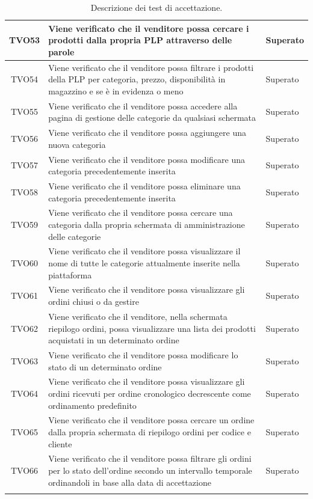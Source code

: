 \begin{longtable}{|c| C{10cm} |C{3cm}|}
	TVO53 & Viene verificato che il venditore possa cercare i prodotti dalla propria PLP attraverso delle parole & Superato\\ \hline
	TVO54 & Viene verificato che il venditore possa filtrare i prodotti della PLP per categoria, prezzo, disponibilità in magazzino e se è in evidenza o meno & Superato\\ \hline
	TVO55 & Viene verificato che il venditore possa accedere alla pagina di gestione delle categorie da qualsiasi schermata & Superato\\ \hline
	TVO56 & Viene verificato che il venditore possa aggiungere una nuova categoria & Superato\\ \hline
	TVO57 & Viene verificato che il venditore possa modificare una categoria precedentemente inserita & Superato\\ \hline
	TVO58 & Viene verificato che il venditore possa eliminare una categoria precedentemente inserita & Superato\\ \hline
	TVO59 & Viene verificato che il venditore possa cercare una categoria dalla propria schermata di amministrazione delle categorie & Superato\\ \hline
	TVO60 & Viene verificato che il venditore possa visualizzare il nome di tutte le categorie attualmente inserite nella piattaforma & Superato\\ \hline
	TVO61 & Viene verificato che il venditore possa visualizzare gli ordini chiusi o da gestire & Superato\\ \hline
	TVO62 & Viene verificato che il venditore, nella schermata riepilogo ordini,  possa visualizzare una lista dei prodotti acquistati in un determinato ordine & Superato\\ \hline
	TVO63 & Viene verificato che il venditore possa modificare lo stato di un determinato ordine & Superato\\ \hline
	TVO64 & Viene verificato che il venditore possa visualizzare gli ordini ricevuti per ordine cronologico decrescente come ordinamento predefinito & Superato\\ \hline
	TVO65 & Viene verificato che il venditore possa cercare un ordine dalla propria schermata di riepilogo ordini per codice e cliente & Superato\\ \hline
	TVO66 & Viene verificato che il venditore possa filtrare gli ordini per lo stato dell'ordine secondo un intervallo temporale ordinandoli in base alla data di accettazione & Superato\\ \hline
	\caption{Descrizione dei test di accettazione.}
\end{longtable}